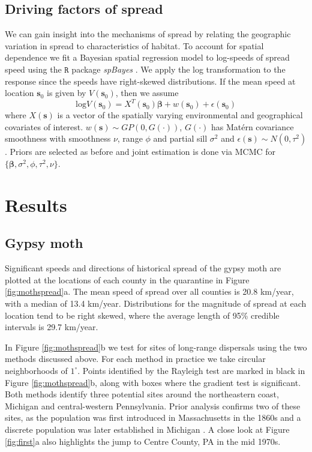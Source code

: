 \documentclass[12pt]{article}
\begin{document}
\subsection{Driving factors of spread}

We can gain insight into the mechanisms of spread by relating the geographic variation in spread to characteristics of habitat. To account for spatial dependence we fit a Bayesian spatial regression model to log-speeds of spread speed using the $\texttt{R}$ package {\it spBayes} \citep{spBayes}. We apply the log transformation to the response since the speeds have right-skewed distributions. If the mean speed at location $\bm s_0$ is given by $V(\bm s_0)$, then we assume
\[
\text{log} V(\bm s_0) = X^T(\bm s_0) \bm\beta + w(\bm s_0) + \epsilon(\bm s_0)
\]
where $X( \bm s )$ is a vector of the spatially varying environmental and geographical covariates of interest. $w(\bm s) \sim GP(0,G(\cdot))$, $G(\cdot)$ has Mat\'ern covariance smoothness with smoothness $\nu$, range $\phi$ and partial sill $\sigma^2$ and $\epsilon(\bm s) \sim N(0,\tau^2)$. Priors are selected as before and joint estimation is done via MCMC for  $\{ \bm\beta, \sigma^2, \phi, \tau^2, \nu \}$.

\section{Results}\label{sec:results}

\subsection{Gypsy moth}

Significant speeds and directions of historical spread of the gypsy moth are plotted at the locations of each county in the quarantine in Figure \ref{fig:mothspread}a. The mean speed of spread over all counties is 20.8 km/year, with a median of 13.4 km/year.  Distributions for the magnitude of spread at each location tend to be right skewed, where the average length of 95\% credible intervals is 29.7 km/year.

In Figure \ref{fig:mothspread}b we test for sites of long-range dispersals using the two methods discussed above. For each method in practice we take circular neighborhoods of $1^{\circ}$. Points identified by the Rayleigh test are marked in black in Figure \ref{fig:mothspread}b, along with boxes where the gradient test is significant. Both methods identify three potential sites around the northeastern coast, Michigan and central-western Pennsylvania. Prior analysis confirms two of these sites, as the population was first introduced in Massachusetts in the 1860s and a discrete population was later established in Michigan \citep{liebhold1992gypsy}. A close look at Figure \ref{fig:first}a also highlights the jump to Centre County, PA in the mid 1970s.
\end{document}
